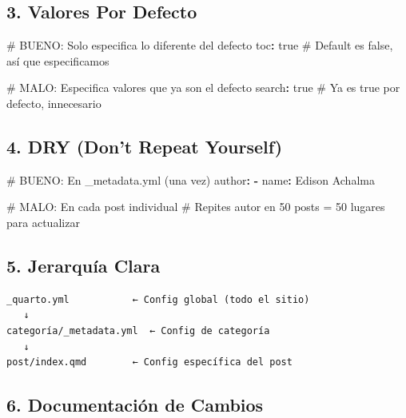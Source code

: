 \documentclass[
  doc,
  floatsintext,
  longtable,
  a4paper,
  nolmodern,
  notxfonts,
  notimes,
  12pt,
  colorlinks=true,linkcolor=blue,citecolor=blue,urlcolor=blue]{apa7}
\newenvironment{Shaded}{\begin{snugshade}}{\end{snugshade}}
\newcommand{\AttributeTok}[1]{\textcolor[rgb]{0.40,0.45,0.13}{#1}}
\newcommand{\CharTok}[1]{\textcolor[rgb]{0.13,0.47,0.30}{#1}}
\newcommand{\CommentTok}[1]{\textcolor[rgb]{0.37,0.37,0.37}{#1}}
\newcommand{\FunctionTok}[1]{\textcolor[rgb]{0.28,0.35,0.67}{#1}}
\newcommand{\KeywordTok}[1]{\textcolor[rgb]{0.00,0.23,0.31}{\textbf{#1}}}
\begin{document}
\subsection{3. Valores Por Defecto}\label{valores-por-defecto}

\begin{Shaded}
\begin{Highlighting}[]
\CommentTok{\# BUENO: Solo especifica lo diferente del defecto}
\FunctionTok{toc}\KeywordTok{:}\AttributeTok{ }\CharTok{true}\CommentTok{         \# Default es false, así que especificamos}

\CommentTok{\#  MALO: Especifica valores que ya son el defecto}
\FunctionTok{search}\KeywordTok{:}\AttributeTok{ }\CharTok{true}\CommentTok{      \# Ya es true por defecto, innecesario}
\end{Highlighting}
\end{Shaded}

\subsection{4. DRY (Don't Repeat
Yourself)}\label{dry-dont-repeat-yourself}

\begin{Shaded}
\begin{Highlighting}[]
\CommentTok{\# BUENO: En \_metadata.yml (una vez)}
\FunctionTok{author}\KeywordTok{:}
\AttributeTok{  }\KeywordTok{{-}}\AttributeTok{ }\FunctionTok{name}\KeywordTok{:}\AttributeTok{ Edison Achalma}

\CommentTok{\#  MALO: En cada post individual}
\CommentTok{\# Repites autor en 50 posts = 50 lugares para actualizar}
\end{Highlighting}
\end{Shaded}

\subsection{5. Jerarquía Clara}\label{jerarquuxeda-clara}

\begin{verbatim}
_quarto.yml           ← Config global (todo el sitio)
   ↓
categoría/_metadata.yml  ← Config de categoría
   ↓
post/index.qmd        ← Config específica del post
\end{verbatim}

\subsection{6. Documentación de
Cambios}\label{documentaciuxf3n-de-cambios}
\end{document}
